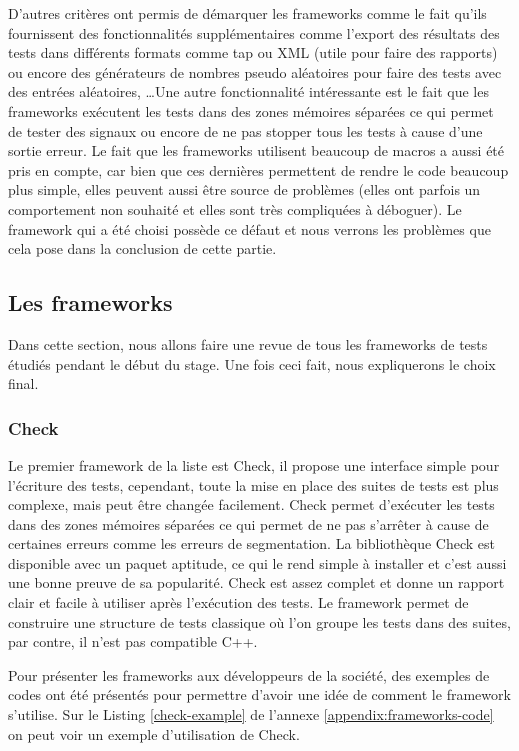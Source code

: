 \documentclass[a4paper]{article}
\begin{document}
D'autres critères ont permis de démarquer les frameworks comme le fait qu'ils
fournissent des fonctionnalités supplémentaires comme l'export des résultats des
tests dans différents formats comme \gls{tap} ou XML (utile pour faire des
rapports) ou encore des générateurs de nombres pseudo aléatoires pour faire des
tests avec des entrées aléatoires, \dots Une autre fonctionnalité intéressante
est le fait que les frameworks exécutent les tests dans des zones mémoires
séparées ce qui permet de tester des signaux ou encore de ne pas stopper tous les
tests à cause d'une sortie erreur. Le fait que les frameworks utilisent beaucoup
de macros a aussi été pris en compte, car bien que ces dernières permettent de
rendre le code beaucoup plus simple, elles peuvent aussi être source de
problèmes (elles ont parfois un comportement non souhaité et elles sont très
compliquées à déboguer). Le framework qui a été choisi possède ce défaut et nous
verrons les problèmes que cela pose dans la conclusion de cette partie.
\subsection{Les frameworks}%

Dans cette section, nous allons faire une revue de tous les frameworks de tests
étudiés pendant le début du stage. Une fois ceci fait, nous expliquerons le
choix final.

\subsubsection*{Check}

Le premier framework de la liste est Check, il propose une interface simple pour
l'écriture des tests, cependant, toute la mise en place des suites de tests est
plus complexe, mais peut être changée facilement. Check permet d'exécuter les
tests dans des zones mémoires séparées ce qui permet de ne pas s'arrêter à cause
de certaines erreurs comme les erreurs de segmentation. La bibliothèque Check
est disponible avec un paquet aptitude, ce qui le rend simple à installer et
c'est aussi une bonne preuve de sa popularité. Check est assez complet et donne
un rapport clair et facile à utiliser après l'exécution des tests. Le framework
permet de construire une structure de tests classique où l'on groupe les tests
dans des suites, par contre, il n'est pas compatible C++.

Pour présenter les frameworks aux développeurs de la société, des exemples de
codes ont été présentés pour permettre d'avoir une idée de comment le framework
s'utilise. Sur le Listing \ref{check-example} de l'annexe
\ref{appendix:frameworks-code} on peut voir un exemple d'utilisation de Check.
\end{document}
